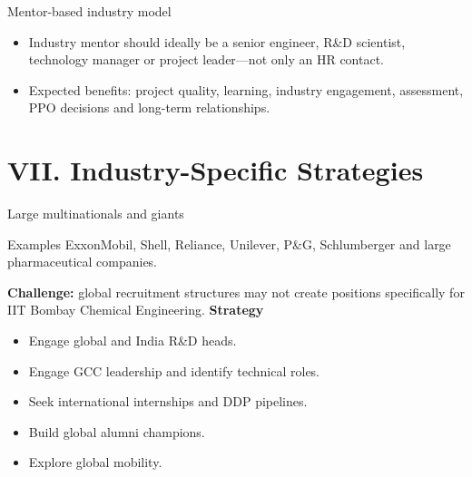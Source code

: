 \documentclass[aspectratio=169,11pt]{beamer}
\begin{document}
\begin{frame}{Mentor-based industry model}
\begin{center}
\end{center}
\vspace{5mm}
\begin{itemize}
\item Industry mentor should ideally be a senior engineer, R\&D scientist, technology manager or project leader—not only an HR contact.
\item Expected benefits: project quality, learning, industry engagement, assessment, PPO decisions and long-term relationships.
\end{itemize}
\end{frame}

\section{VII. Industry-Specific Strategies}
\begin{frame}{Large multinationals and giants}
\begin{block}{Examples}
ExxonMobil, Shell, Reliance, Unilever, P\&G, Schlumberger and large pharmaceutical companies.
\end{block}
\textbf{Challenge:} global recruitment structures may not create positions specifically for IIT Bombay Chemical Engineering.
\vspace{3mm}
\textbf{Strategy}
\begin{itemize}
\item Engage global and India R\&D heads.
\item Engage GCC leadership and identify technical roles.
\item Seek international internships and DDP pipelines.
\item Build global alumni champions.
\item Explore global mobility.
\end{itemize}
\end{frame}
\end{document}
